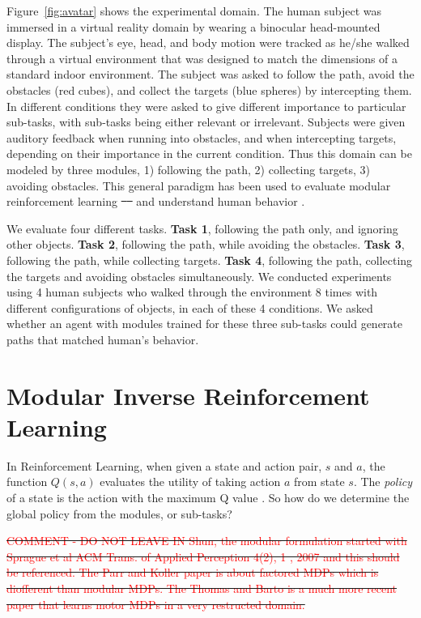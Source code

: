 \documentclass[11pt]{article} %
\providecommand{\DIFadd}[1]{{\protect\color{blue}\uwave{#1}}} %
\providecommand{\DIFdel}[1]{{\protect\color{red}\sout{#1}}}                      %
\providecommand{\DIFaddbegin}{} %
\providecommand{\DIFaddend}{} %
\providecommand{\DIFdelbegin}{} %
\providecommand{\DIFdelend}{} %
\begin{document}
Figure~\ref{fig:avatar} shows the experimental domain. The
human subject was immersed in a virtual reality domain by wearing a binocular head-mounted display.
The subject's eye, head, and body motion were tracked as he/she walked through a
virtual environment that was designed to match the dimensions of a standard indoor
environment. The subject was asked to follow the path, avoid the obstacles (red
cubes), and collect the targets (blue spheres) by intercepting them. In
different conditions they were asked to give different importance to particular
sub-tasks, with sub-tasks being either relevant or irrelevant. Subjects were
given auditory feedback when running into obstacles, and when intercepting
targets, depending on their importance in the current condition. Thus this
domain can be modeled by three modules, 1) following the path, 2) collecting targets, 3)
avoiding obstacles.  This general paradigm has been used to evaluate modular
reinforcement learning \DIFdelbegin \DIFdel{\mbox{%
\cite{rothkopf2013modular}
}%
}\DIFdelend \DIFaddbegin \DIFadd{\mbox{%
\cite{Rothkopf12Infer, rothkopf2013modular}
}%
}\DIFaddend and understand human behavior
\cite{Tong2014}.

We evaluate four different tasks. {\bf Task 1}, following the path only, and
ignoring other objects. {\bf Task 2}, following the path, while avoiding the
obstacles.  {\bf Task 3}, following the path, while collecting targets. {\bf
Task 4}, following the path, collecting the targets and avoiding obstacles
simultaneously.  We conducted experiments using 4 human subjects who walked
through the environment 8 times with different configurations of objects, in
each of these 4 conditions.  We asked whether an agent with modules trained for
these three sub-tasks could generate paths that matched human's behavior.

\section{Modular Inverse Reinforcement Learning}
\label{sec:rl}

In Reinforcement Learning, when given a state and action pair, $s$ and $a$, the
function $Q(s, a)$ evaluates the utility of taking action $a$ from state $s$.
The {\em policy} of a state is the action with the maximum Q value \cite{rl}. So
how do we determine the global policy from the modules, or sub-tasks?

\DIFdelbegin \DIFdel{\textcolor{red}{COMMENT - DO NOT LEAVE IN Shun, the modular formulation started with Sprague et al ACM Trans. of Applied Perception 4(2), 1 , 2007 and this should be referenced.
The Parr and Koller paper is about factored MDPs which is diofferent than modular MDPs. The Thomas and Barto is a much more recent paper
that learns motor MDPs in a very restructed domain.}
}\DIFdelend 
\end{document}
